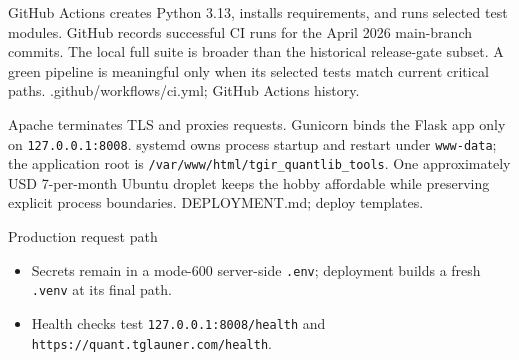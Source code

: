 {GitHub Actions creates Python 3.13, installs requirements, and runs selected test modules.}
{GitHub records successful CI runs for the April 2026 main-branch commits.}
{The local full suite is broader than the historical release-gate subset.}
{A green pipeline is meaningful only when its selected tests match current critical paths.}
{.github/workflows/ci.yml; GitHub Actions history.}

{Apache terminates TLS and proxies requests.}
{Gunicorn binds the Flask app only on \texttt{127.0.0.1:8008}.}
{systemd owns process startup and restart under \texttt{www-data}; the application root is \texttt{/var/www/html/tgir\_quantlib\_tools}.}
{One approximately USD 7-per-month Ubuntu droplet keeps the hobby affordable while preserving explicit process boundaries.}
{DEPLOYMENT.md; deploy templates.}

\begin{frame}{Production request path}
  \centering
  \vspace{7mm}
  \begin{itemize}\setlength\itemsep{0.7em}
    \item Secrets remain in a mode-600 server-side \texttt{.env}; deployment builds a fresh \texttt{.venv} at its final path.
    \item Health checks test \texttt{127.0.0.1:8008/health} and \texttt{https://quant.tglauner.com/health}.
  \end{itemize}
\end{frame}

